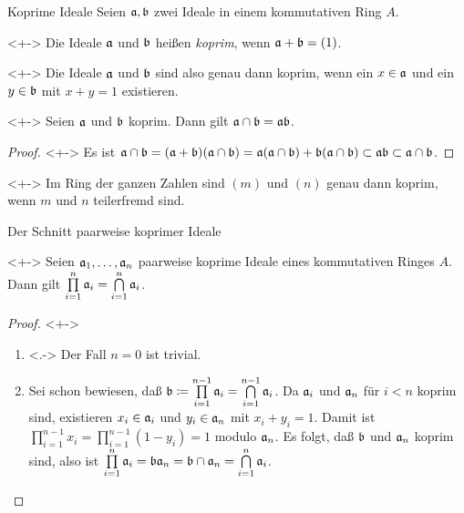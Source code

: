 \begin{frame}{Koprime Ideale}
    Seien \(\mathfrak{a}, \mathfrak{b}\) zwei Ideale in einem kommutativen Ring \(A\).
    \begin{definition}<+->
        Die Ideale \(\mathfrak{a}\) und \(\mathfrak{b}\) heißen \emph{koprim}, wenn
        \(\mathfrak{a} + \mathfrak{b} = (1)\).
    \end{definition}
    \begin{visibleenv}<+->
        Die Ideale \(\mathfrak{a}\) und \(\mathfrak{b}\) sind also genau dann koprim,
        wenn ein \(x \in \mathfrak{a}\) und ein \(y \in \mathfrak{b}\) mit \(x + y = 1\)
        existieren.
    \end{visibleenv}
    \begin{lemma}<+->
        Seien \(\mathfrak{a}\) und \(\mathfrak{b}\) koprim. Dann gilt \(\mathfrak{a} \cap
        \mathfrak{b} = \mathfrak{a} \mathfrak{b}\).
    \end{lemma}
    \begin{proof}<+->
        Es ist
        \(\mathfrak{a} \cap \mathfrak{b} = (\mathfrak{a} + \mathfrak{b})(\mathfrak{a}
        \cap \mathfrak{b}) = \mathfrak{a} (\mathfrak{a} \cap \mathfrak{b}) + \mathfrak{b} (\mathfrak{a}
        \cap \mathfrak{b}) \subset \mathfrak{a} \mathfrak{b} \subset \mathfrak{a} \cap \mathfrak{b}\).
    \end{proof}
    \begin{example}<+->
        Im Ring der ganzen Zahlen sind \((m)\) und \((n)\) genau dann koprim,
        wenn \(m\) und \(n\) teilerfremd sind.
    \end{example}
\end{frame}

\begin{frame}{Der Schnitt paarweise koprimer Ideale}
    \begin{proposition}<+->
        Seien \(\mathfrak{a}_1, \dotsc, \mathfrak{a}_n\) paarweise koprime Ideale eines
        kommutativen Ringes \(A\). Dann gilt \(\prod\limits_{i = 1}^n \mathfrak{a}_i
        = \bigcap\limits_{i = 1}^n \mathfrak{a}_i\).
    \end{proposition}
    \begin{proof}<+->
        \begin{enumerate}[<+->]
        \item<.->
            Der Fall \(n = 0\) ist trivial.
        \item
            Sei schon bewiesen, daß \(\mathfrak{b} \coloneqq
            \prod\limits_{i = 1}^{n - 1} \mathfrak{a}_i
            = \bigcap\limits_{i = 1}^{n - 1} \mathfrak{a}_i\). Da \(\mathfrak{a}_i\)
            und \(\mathfrak{a}_n\) für \(i < n\) koprim sind, existieren \(x_i \in
            \mathfrak{a}_i\) und \(y_i \in \mathfrak{a}_n\) mit \(x_i + y_i = 1\).
            Damit ist \(\prod\limits_{i = 1}^{n - 1} x_i
            = \prod\limits_{i = 1}^{n - 1} (1 - y_i) = 1\) modulo
            \(\mathfrak{a}_n\). Es folgt, daß \(\mathfrak{b}\) und \(\mathfrak{a}_n\)
            koprim sind, also ist
            \(\prod\limits_{i = 1}^n \mathfrak{a}_i = \mathfrak{b} \mathfrak{a}_n = \mathfrak{b}
            \cap \mathfrak{a}_n = \bigcap\limits_{i = 1}^n \mathfrak{a}_i\).
            \qedhere
        \end{enumerate}
    \end{proof}
\end{frame}

